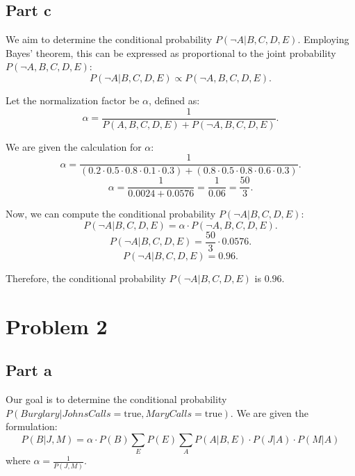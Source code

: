 \documentclass[12pt]{article}
\begin{document}
\subsection*{Part c}

We aim to determine the conditional probability $P(\neg A | B, C, D, E)$. Employing Bayes' theorem, this can be expressed as proportional to the joint probability $P(\neg A, B, C, D, E)$:
$$P(\neg A | B, C, D, E) \propto P(\neg A, B, C, D, E).$$

Let the normalization factor be $\alpha$, defined as:
$$\alpha = \frac{1}{P(A, B, C, D, E) + P(\neg A, B, C, D, E)}.$$

We are given the calculation for $\alpha$:
$$\alpha = \frac{1}{(0.2 \cdot 0.5 \cdot 0.8 \cdot 0.1 \cdot 0.3) + (0.8 \cdot 0.5 \cdot 0.8 \cdot 0.6 \cdot 0.3)}.$$
$$\alpha = \frac{1}{0.0024 + 0.0576} = \frac{1}{0.06} = \frac{50}{3}.$$

Now, we can compute the conditional probability $P(\neg A | B, C, D, E)$:
$$P(\neg A | B, C, D, E) = \alpha \cdot P(\neg A, B, C, D, E).$$
$$P(\neg A | B, C, D, E) = \frac{50}{3} \cdot 0.0576.$$
$$P(\neg A | B, C, D, E) = 0.96.$$

Therefore, the conditional probability $P(\neg A | B, C, D, E)$ is $0.96$.

\section{Problem 2}

\subsection*{Part a}

Our goal is to determine the conditional probability $P(Burglary | JohnsCalls = \text{true}, MaryCalls = \text{true})$. We are given the formulation:
$$P(B|J, M) = \alpha \cdot P(B) \sum_{E} P(E) \sum_{A} P(A|B, E) \cdot P(J|A) \cdot P(M|A)$$
where $\alpha = \frac{1}{P(J, M)}$.
\end{document}

